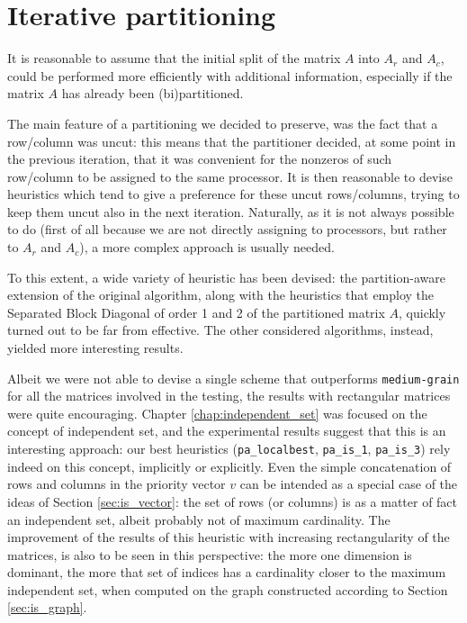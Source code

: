 \section{Iterative partitioning} \label{sec:conclusions_pa}

It is reasonable to assume that the initial split of the matrix $A$ into $A_r$ and $A_c$, could be performed more efficiently with additional information, especially if the matrix $A$ has already been (bi)partitioned. 

The main feature of a partitioning we decided to preserve, was the fact that a row/column was uncut: this means that the partitioner decided, at some point in the previous iteration, that it was convenient for the nonzeros of such row/column to be assigned to the same processor. It is then reasonable to devise heuristics which tend to give a preference for these uncut rows/columns, trying to keep them uncut also in the next iteration. Naturally, as it is not always possible to do (first of all because we are not directly assigning to processors, but rather to $A_r$ and $A_c$), a more complex approach is usually needed.

To this extent, a wide variety of heuristic has been devised: the partition-aware extension of the original algorithm, along with the heuristics that employ the Separated Block Diagonal of order 1 and 2 of the partitioned matrix $A$, quickly turned out to be far from effective. The other considered algorithms, instead, yielded more interesting results.

Albeit we were not able to devise a single scheme that outperforms \verb|medium-grain| for all the matrices involved in the testing, the results with rectangular matrices were quite encouraging. Chapter \ref{chap:independent_set} was focused on the concept of independent set, and the experimental results suggest that this is an interesting approach: our best heuristics (\verb|pa_localbest|, \verb|pa_is_1|, \verb|pa_is_3|) rely indeed on this concept, implicitly or explicitly. Even the simple concatenation of rows and columns in the priority vector $v$ can be intended as a special case of the ideas of Section \ref{sec:is_vector}: the set of rows (or columns) is as a matter of fact an independent set, albeit probably not of maximum cardinality. The improvement of the results of this heuristic with increasing rectangularity of the matrices, is also to be seen in this perspective: the more one dimension is dominant, the more that set of indices has a cardinality closer to the maximum independent set, when computed on the graph constructed according to Section \ref{sec:is_graph}.

